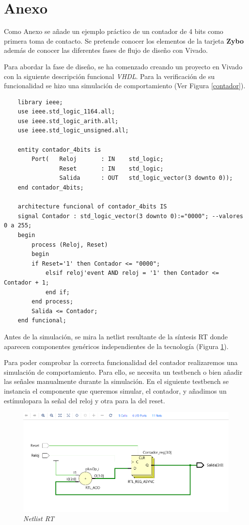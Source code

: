 \chapter*{Anexo}

Como Anexo se añade un ejemplo práctico de un contador de 4 bits como primera toma de contacto. Se pretende conocer los elementos 
de la tarjeta \textbf{Zybo} además de conocer las diferentes fases de flujo de diseño con Vivado.

Para abordar la fase de diseño, se ha comenzado creando un proyecto en Vivado con la siguiente descripción funcional \textit{VHDL}. Para la verificación de su 
funcionalidad se hizo una simulación de comportamiento (Ver Figura \ref{contador}).

\vspace{1cm}

\begin{lstlisting}
    library ieee;
    use ieee.std_logic_1164.all;
    use ieee.std_logic_arith.all;
    use ieee.std_logic_unsigned.all;

    entity contador_4bits is
        Port(	Reloj		: IN	std_logic;
                Reset		: IN 	std_logic;
                Salida		: OUT	std_logic_vector(3 downto 0));
    end contador_4bits;

    architecture funcional of contador_4bits IS
    signal Contador : std_logic_vector(3 downto 0):="0000"; --valores 0 a 255;
    begin
        process (Reloj, Reset)
        begin
        if Reset='1' then Contador <= "0000";
            elsif reloj'event AND reloj = '1' then Contador <= Contador + 1;			
            end if;
        end process;
        Salida <= Contador;
    end funcional;
\end{lstlisting}

Antes de la simulación, se mira la netlist resultante de la síntesis RT donde aparecen componentes genéricos 
independientes de la tecnología (Figura \ref{netlist2}).

Para poder comprobar la correcta funcionalidad del contador realizaremos una simulación de comportamiento. Para ello, 
se necesita un testbench o bien añadir las señales manualmente durante la simulación. En el siguiente testbench se 
instancia el componente que queremos simular, el contador, y añadimos un estímulopara la señal del reloj y otra para 
la del reset.

\begin{figure}[H]
    \centering
    \includegraphics[width = 1\textwidth]{imagenes/netlist2.png}
    \caption{\textit{Netlist RT}}\label{netlist2}
\end{figure}

